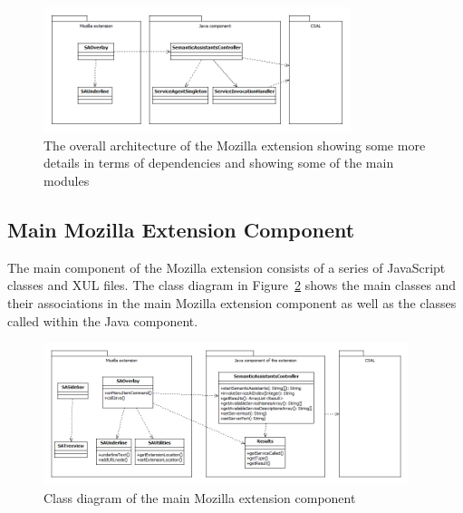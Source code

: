 \begin{figure}[htb]
  \centering
  \includegraphics[width=0.8\textwidth]{pictures/mozilla_development_notes_overall_architecture_more_detailed.png}
  \caption{The overall architecture of the Mozilla extension showing some more details in terms of dependencies and showing some of the main modules}
  \label{fig:mozilla_development_notes_overall_architecture_more_detailed}
\end{figure}

\subsection{Main Mozilla Extension Component}
The main component of the Mozilla extension consists of a series of JavaScript classes and XUL files. The class diagram in Figure~\ref{fig:mozilla_development_notes_mozilla_extension_class_diagram} shows the main classes and their associations in the main Mozilla extension component as well as the classes called within the Java component. 

\begin{figure}[htb]
  \centering
  \includegraphics[width=0.95\textwidth]{pictures/mozilla_development_notes_mozilla_extension_class_diagram.png}
  \caption{Class diagram of the main Mozilla extension component}
  \label{fig:mozilla_development_notes_mozilla_extension_class_diagram}
\end{figure}

